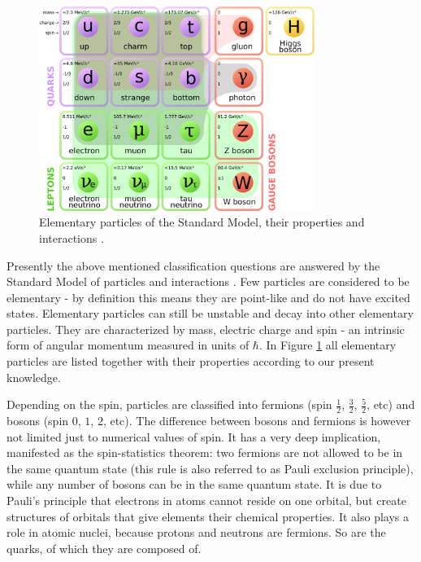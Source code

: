 \begin{figure}
  \centering
  \includegraphics[width = 0.8\textwidth]{illustrations/intro_illustrations/Standard_Model.pdf}
  \caption{Elementary particles of the Standard Model, their properties and
           interactions \cite{elementary_particles_wiki}.}
  \label{fig:standard_model}
\end{figure}

Presently the above mentioned classification questions are answered by the
Standard Model of particles and interactions \cite{standard_model}.  Few
particles are considered to be elementary - by definition this means they are
point-like and do not have excited states.  Elementary particles can still be
unstable and decay into other elementary particles.  They are
characterized by mass, electric charge and spin - an intrinsic form of angular
momentum measured in units of $\hbar$. In Figure \ref{fig:standard_model} all
elementary particles are listed together with their properties according
to our present knowledge.

Depending on the spin, particles are classified into fermions (spin $\frac{1}{2}$,
$\frac{3}{2}$, $\frac{5}{2}$, etc) and bosons (spin $0$, $1$, $2$, etc). 
The difference between bosons and fermions is however not limited just to numerical
values of spin. It has a very deep
implication, manifested as the spin-statistics theorem: two fermions are not
allowed to be in the same quantum state (this rule is also referred to as Pauli
exclusion principle), while any number of bosons can be in the same quantum
state. It is due to Pauli's principle that electrons in atoms cannot reside on one
orbital, but create structures of orbitals that give elements their chemical
properties.  It also plays a role in atomic nuclei, because protons and
neutrons are fermions.  So are the quarks, of which they are composed of.

